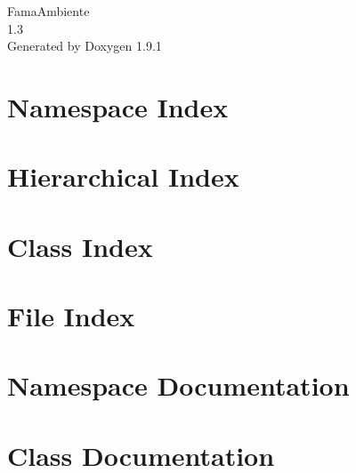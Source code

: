 \let\mypdfximage\pdfximage\def\pdfximage{\immediate\mypdfximage}\documentclass[twoside]{book}
\newcommand{\+}{\discretionary{\mbox{\scriptsize$\hookleftarrow$}}{}{}}
\newcommand{\clearemptydoublepage}{%
  \newpage{\pagestyle{empty}\cleardoublepage}%
}
\begin{document}
\raggedbottom

\begin{titlepage}
\vspace*{7cm}
\begin{center}%
{\Large Fama\+Ambiente \\[1ex]\large 1.\+3 }\\
\vspace*{1cm}
{\large Generated by Doxygen 1.9.1}\\
\end{center}
\end{titlepage}
\clearemptydoublepage
{}
\tableofcontents
\clearemptydoublepage
{}

\chapter{Namespace Index}

\chapter{Hierarchical Index}

\chapter{Class Index}

\chapter{File Index}

\chapter{Namespace Documentation}




\chapter{Class Documentation}















\end{document}
